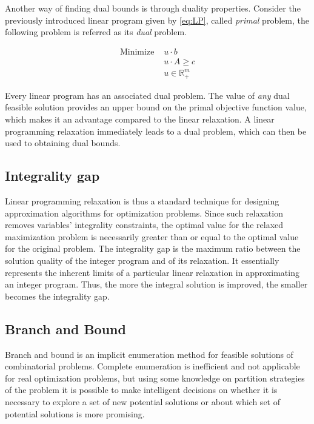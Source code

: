 Another way of finding dual bounds is through duality properties. Consider the previously introduced linear program given by \eqref{eq:LP}, called \textit{primal} problem, the following problem is referred as its \textit{dual} problem.

\begin{subequations}
\label{eq:Dual}
\begin{align}
   \mbox{Minimize } & u \cdot b
								\\ & u \cdot A \ge c
								\\ & u \in \mathbb{R}^{m}_{+}
\end{align}
\end{subequations}

Every linear program has an associated dual problem. The value of \textit{any} dual feasible solution provides an upper bound on the primal objective function value, which makes it an advantage compared to the linear relaxation. A linear programming relaxation immediately leads to a dual problem, which can then be used to obtaining dual bounds.


\subsection{Integrality gap}

Linear programming relaxation is thus a standard technique for designing approximation algorithms for optimization problems. Since such relaxation removes variables' integrality constraints, the optimal value for the relaxed maximization problem is necessarily greater than or equal to the optimal value for the original problem. The integrality gap is the maximum ratio between the solution quality of the integer program and of its relaxation. It essentially represents the inherent limits of a particular linear relaxation in approximating an integer program. Thus, the more the integral solution is improved, the smaller becomes the integrality gap.


\subsection{Branch and Bound}

Branch and bound is an implicit enumeration method for feasible solutions of combinatorial problems. Complete enumeration is inefficient and not applicable for real optimization problems, but using some knowledge on partition strategies of the problem it is possible to make intelligent decisions on whether it is necessary to explore a set of new potential solutions or about which set of potential solutions is more promising.

